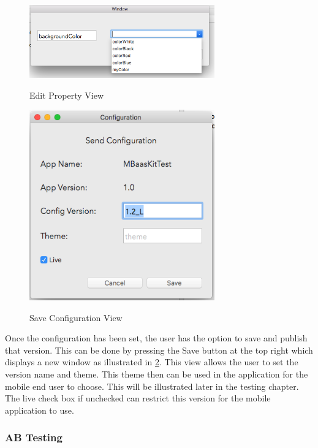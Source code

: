 

\begin{figure}[!h]
    \caption{Edit Property View}
    \centering
    \includegraphics[width=80mm]{images/dashboard/property-1}
    \label{fig:property1}
\end{figure} 

\begin{figure}[!h]
    \caption{Save Configuration View}
    \centering
    \includegraphics[width=80mm]{images/dashboard/configuration}
    \label{fig:configuration}
\end{figure} 

Once the configuration has been set, the user has the option to save and publish that version. This can be done by pressing the Save button at the top right which displays a new window as illustrated in \ref{fig:configuration}. This view allows the user to set the version name and theme. This theme then can be used in the application for the mobile end user to choose. This will be illustrated later in the testing chapter. The live check box if unchecked can restrict this version for the mobile application to use. 

\subsubsection{AB Testing}


